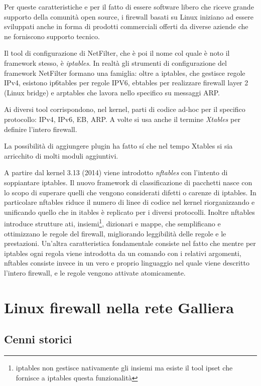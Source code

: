 Per queste caratteristiche e per il fatto di essere software libero che riceve
grande supporto della comunità open source, i firewall basati su Linux
iniziano ad essere sviluppati anche in forma di prodotti commerciali offerti
da diverse aziende che ne forniscono supporto tecnico.

Il tool di configurazione di NetFilter, che è poi il nome col quale è noto il
framework stesso, è {\em iptables}.
In realtà gli strumenti di configurazione del framework NetFilter formano una
famiglia: oltre a iptables, che gestisce regole IPv4, esistono ip6tables per
regole IPV6, ebtables per realizzare firewall layer 2 (Linux bridge)
e arptables che lavora nello specifico su messaggi ARP.

Ai diversi tool corrispondono, nel kernel, parti di codice ad-hoc per il
specifico protocollo: IPv4, IPv6, EB, ARP.  A volte si usa anche il termine
{\em Xtables} per definire l'intero firewall.

La possibilità di aggiungere plugin ha fatto s\'i che nel tempo Xtables si
sia arricchito di molti moduli aggiuntivi.

A partire dal kernel 3.13 (2014) viene introdotto {\em nftables} con l'intento
di soppiantare iptables.  Il nuovo framework di classificazione di pacchetti
nasce con lo scopo di superare quelli che vengono considerati difetti o
carenze di iptables.  In particolare nftables riduce il numero di linee di
codice nel kernel riorganizzando e unificando quello che in itables è
replicato per i diversi protocolli.  Inoltre nftables introduce strutture
ati, insiemi\footnote{iptables non gestisce nativamente gli insiemi ma esiste
il tool ipset che fornisce a iptables questa funzionalità}, dizionari e mappe,
che semplificano e ottimizzano le regole del firewall, migliorando leggibilità
delle regole e le prestazioni. Un'altra caratteristica fondamentale consiste
nel fatto che mentre per iptables ogni regola viene introdotta da un comando
con i relativi argomenti, nftables consiste invece in un vero e proprio
linguaggio nel quale viene descritto l'intero firewall, e le regole vengono
attivate atomicamente.

\chapter{Linux firewall nella rete Galliera}

\section{Cenni storici}

